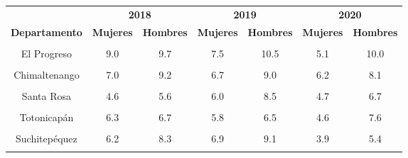 \begin{tabular}[t]{ccccccc}
\toprule
\multicolumn{1}{c}{\textbf{ }} & \multicolumn{2}{c}{\textbf{2018}} & \multicolumn{2}{c}{\textbf{2019}} & \multicolumn{2}{c}{\textbf{2020}} \\
\cmidrule(l{3pt}r{3pt}){2-3} \cmidrule(l{3pt}r{3pt}){4-5} \cmidrule(l{3pt}r{3pt}){6-7}
\textbf{Departamento} & \textbf{Mujeres} & \textbf{Hombres} & \textbf{Mujeres} & \textbf{Hombres} & \textbf{Mujeres} & \textbf{Hombres}\\
\midrule
\cellcolor[HTML]{B6B3FF}{Guatemala} & \cellcolor[HTML]{B6B3FF}{7.9} & \cellcolor[HTML]{B6B3FF}{12.8} & \cellcolor[HTML]{B6B3FF}{8.7} & \cellcolor[HTML]{B6B3FF}{12.8} & \cellcolor[HTML]{B6B3FF}{7.9} & \cellcolor[HTML]{B6B3FF}{12.2}\\
El Progreso & 9.0 & 9.7 & 7.5 & 10.5 & 5.1 & 10.0\\
\cellcolor[HTML]{B6B3FF}{Sacatepéquez} & \cellcolor[HTML]{B6B3FF}{6.7} & \cellcolor[HTML]{B6B3FF}{9.2} & \cellcolor[HTML]{B6B3FF}{5.7} & \cellcolor[HTML]{B6B3FF}{7.4} & \cellcolor[HTML]{B6B3FF}{4.8} & \cellcolor[HTML]{B6B3FF}{7.6}\\
Chimaltenango & 7.0 & 9.2 & 6.7 & 9.0 & 6.2 & 8.1\\
\cellcolor[HTML]{B6B3FF}{Escuintla} & \cellcolor[HTML]{B6B3FF}{7.6} & \cellcolor[HTML]{B6B3FF}{12.6} & \cellcolor[HTML]{B6B3FF}{6.7} & \cellcolor[HTML]{B6B3FF}{11.9} & \cellcolor[HTML]{B6B3FF}{3.2} & \cellcolor[HTML]{B6B3FF}{6.9}\\
Santa Rosa & 4.6 & 5.6 & 6.0 & 8.5 & 4.7 & 6.7\\
\cellcolor[HTML]{B6B3FF}{Sololá} & \cellcolor[HTML]{B6B3FF}{5.8} & \cellcolor[HTML]{B6B3FF}{9.9} & \cellcolor[HTML]{B6B3FF}{6.2} & \cellcolor[HTML]{B6B3FF}{8.9} & \cellcolor[HTML]{B6B3FF}{7.0} & \cellcolor[HTML]{B6B3FF}{9.8}\\
Totonicapán & 6.3 & 6.7 & 5.8 & 6.5 & 4.6 & 7.6\\
\cellcolor[HTML]{B6B3FF}{Quetzaltenango} & \cellcolor[HTML]{B6B3FF}{6.6} & \cellcolor[HTML]{B6B3FF}{7.7} & \cellcolor[HTML]{B6B3FF}{5.0} & \cellcolor[HTML]{B6B3FF}{7.6} & \cellcolor[HTML]{B6B3FF}{3.6} & \cellcolor[HTML]{B6B3FF}{5.4}\\
Suchitepéquez & 6.2 & 8.3 & 6.9 & 9.1 & 3.9 & 5.4\\
\cellcolor[HTML]{B6B3FF}{Retalhuleu} & \cellcolor[HTML]{B6B3FF}{5.4} & \cellcolor[HTML]{B6B3FF}{7.3} & \cellcolor[HTML]{B6B3FF}{7.7} & \cellcolor[HTML]{B6B3FF}{10.1} & \cellcolor[HTML]{B6B3FF}{6.8} & \cellcolor[HTML]{B6B3FF}{8.8}\\

\end{tabular}
